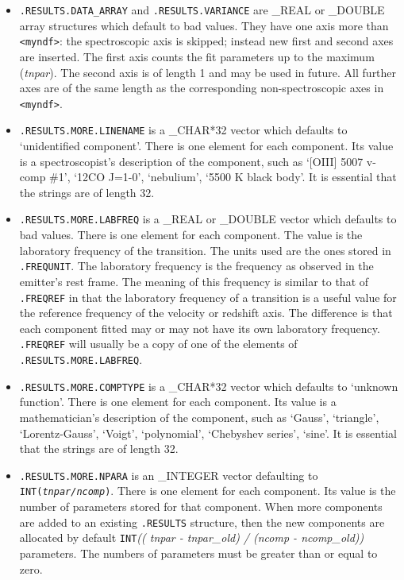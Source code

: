 \documentclass[11pt,twoside]{article}
\begin{document}
\begin{itemize}

\item{\tt .RESULTS.DATA\_ARRAY} and {\tt .RESULTS.VARIANCE} are \_REAL
   or \_DOUBLE array structures which default to bad values. They have
   one axis more than {\tt <myndf>}: the spectroscopic axis is skipped;
   instead new first and second axes are inserted. The first axis counts
   the fit parameters up to the maximum ({\it tnpar}). The second axis
   is of length 1 and may be used in future. All further axes are of the
   same length as the corresponding non-spectroscopic axes in {\tt
   <myndf>}.

\item{\tt .RESULTS.MORE.LINENAME} is a \_CHAR*32 vector which defaults
   to `unidentified component'.  There is one element for each
   component.  Its value is a spectroscopist's description of the
   component, such as `[OIII] 5007 v-comp \#1', `12CO J=1-0',
   `nebulium', `5500 K black body'.  It is essential that the strings
   are of length 32.

\item{\tt .RESULTS.MORE.LABFREQ} is a \_REAL or \_DOUBLE vector which
   defaults to bad values. There is one element for each component. The
   value is the laboratory frequency of the transition. The units used
   are the ones stored in {\tt .FREQUNIT}. The laboratory frequency is the
   frequency as observed in the emitter's rest frame. The meaning of
   this frequency is similar to that of {\tt .FREQREF} in that the
   laboratory frequency of a transition is a useful value for the
   reference frequency of the velocity or redshift axis. The difference
   is that each component fitted may or may not have its own laboratory
   frequency. {\tt .FREQREF} will usually be a copy of one of the
   elements of {\tt .RESULTS.MORE.LABFREQ}.

\item{\tt .RESULTS.MORE.COMPTYPE} is a \_CHAR*32 vector which defaults
   to `unknown function'.  There is one element for each component.
   Its value is a mathematician's description of the component, such as
   `Gauss', `triangle', `Lorentz-Gauss', `Voigt', `polynomial',
   `Chebyshev series', `sine'.  It is essential that the strings are of
   length 32.

\item{\tt .RESULTS.MORE.NPARA} is an \_INTEGER vector defaulting to {\tt
   INT({\it tnpar/ncomp})}. There is one element for each component. Its
   value is the number of parameters stored for that component. When
   more components are added to an existing {\tt .RESULTS} structure,
   then the new components are allocated by default {\tt INT}{\it(( tnpar
   - tnpar\_old) / (ncomp - ncomp\_old))} parameters. The numbers of
   parameters must be greater than or equal to zero.


\end{itemize}
\end{document}
